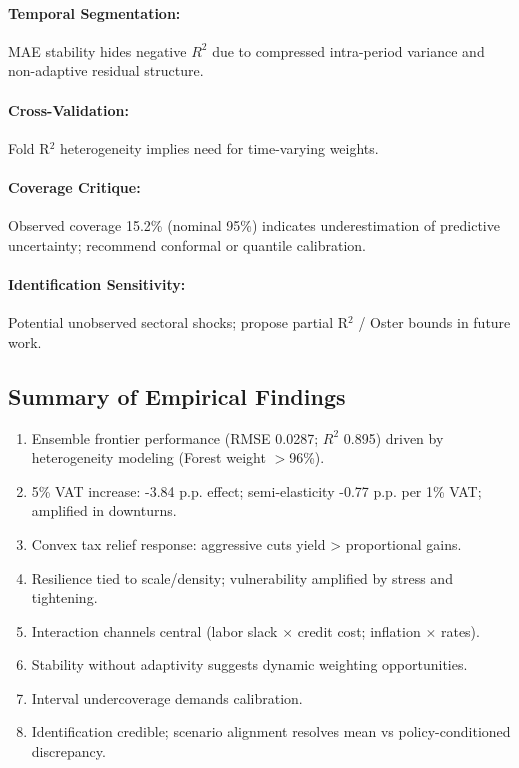 \paragraph{Temporal Segmentation:} MAE stability hides negative $R^2$ due to compressed intra-period variance and non-adaptive residual structure.
\paragraph{Cross-Validation:} Fold R$^2$ heterogeneity implies need for time-varying weights.
\paragraph{Coverage Critique:} Observed coverage 15.2\% (nominal 95\%) indicates underestimation of predictive uncertainty; recommend conformal or quantile calibration.
\paragraph{Identification Sensitivity:} Potential unobserved sectoral shocks; propose partial R$^2$ / Oster bounds in future work.

\subsection{Summary of Empirical Findings}
\begin{enumerate}
  \item Ensemble frontier performance (RMSE 0.0287; $R^2$ 0.895) driven by heterogeneity modeling (Forest weight $>$96\%).
  \item 5\% VAT increase: -3.84 p.p. effect; semi-elasticity -0.77 p.p. per 1\% VAT; amplified in downturns.
  \item Convex tax relief response: aggressive cuts yield > proportional gains.
  \item Resilience tied to scale/density; vulnerability amplified by stress and tightening.
  \item Interaction channels central (labor slack $\times$ credit cost; inflation $\times$ rates).
  \item Stability without adaptivity suggests dynamic weighting opportunities.
  \item Interval undercoverage demands calibration.
  \item Identification credible; scenario alignment resolves mean vs policy-conditioned discrepancy.
\end{enumerate}
